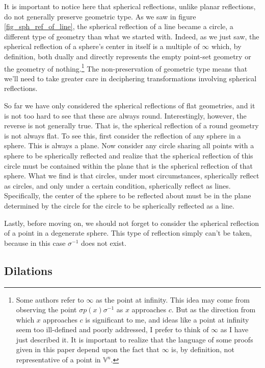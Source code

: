 \documentclass[12pt]{article}
\newcommand{\V}{\mathbb{V}}
\newcommand{\nvai}{\infty}
\begin{document}
It is important to notice here that spherical reflections, unlike planar reflections, do
not generally preserve geometric type.  As we saw in figure \ref{fig_sph_ref_of_line},
the spherical reflection of a line became a circle, a different type of geometry than
what we started with.  Indeed, as we just saw, the spherical reflection of a sphere's
center in itself is a multiple of $\nvai$ which, by definition, both dually and directly represents
the empty point-set geometry or the geometry of nothing.\footnote{Some authors refer to $\nvai$ as the point at
infinity.  This idea may come from observing the point $\sigma p(x)\sigma^{-1}$ as $x$
approaches $c$.  But as the direction from which $x$ approaches $c$ is significant to me,
and ideas like a point at infinity seem too ill-defined and poorly addressed, I prefer to think of $\nvai$
as I have just described it.  It is important to realize that the language of some proofs given in this
paper depend upon the fact that $\nvai$ is, by definition, not representative of a point in $\V^n$.}
The non-preservation of geometric type means that we'll need
to take greater care in deciphering transformations involving spherical reflections.

So far we have only considered the spherical reflections of flat geometries, and it is
not too hard to see that these are always round.  Interestingly, however, the reverse
is not generally true.  That is, the spherical reflection of a round geometry is not
always flat.  To see this, first consider the reflection of any sphere in a sphere.
This is always a plane.  Now consider any circle sharing all points with a sphere to be
spherically reflected and realize that the spherical reflection of this circle must be
contained within the plane that is the spherical reflection of that sphere.  What we find is
that circles, under most circumstances, spherically reflect as circles, and only
under a certain condition, spherically reflect as lines.  Specifically, the center
of the sphere to be reflected about must be in the plane determined by the
circle for the circle to be spherically reflected as a line.

Lastly, before moving on, we should not forget to
consider the spherical reflection of a point in a degenerate sphere.  This
type of reflection simply can't be taken, because in this case $\sigma^{-1}$ does not exist.

\subsection{Dilations}
\end{document}
